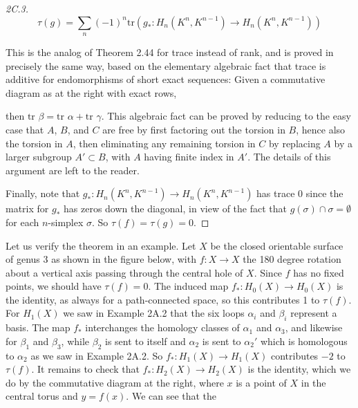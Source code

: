 \begin{proof}[2C.3]
\[
\tau(g) = \sum_n (-1)^n \text{tr}(g_* : H_n(K^n, K^{n-1}) \to H_n(K^n, K^{n-1}))
\]

This is the analog of Theorem 2.44 for trace instead of rank, and is proved in precisely
the same way, based on the elementary algebraic fact that trace is additive for endomorphisms of short exact sequences: Given a commutative diagram as at the right with exact rows,



then $\text{tr } \beta = \text{tr } \alpha + \text{tr } \gamma$. This algebraic fact can be
proved by reducing to the easy case that $A$, $B$, and
$C$ are free by first factoring out the torsion in $B$, hence also the torsion in $A$, then
eliminating any remaining torsion in $C$ by replacing $A$ by a larger subgroup $A' \subset B$,
with $A$ having finite index in $A'$. The details of this argument are left to the reader.

Finally, note that $g_* : H_n(K^n, K^{n-1}) \to H_n(K^n, K^{n-1})$ has trace 0 since the matrix
for $g_*$ has zeros down the diagonal, in view of the fact that $g(\sigma) \cap \sigma = \emptyset$ for each
$n$-simplex $\sigma$. So $\tau(f) = \tau(g) = 0$.
\end{proof}
\begin{example}
\label{ex:lefschetz-surface-rotation}
Let us verify the theorem in an example. Let $X$ be the closed orientable surface of genus 3 as shown in the figure below, with $f:X \to X$ the 180
degree rotation about a vertical axis passing through the central hole of
$X$. Since $f$ has no fixed points, we
should have $\tau(f) = 0$. The induced
map $f_* : H_0(X) \to H_0(X)$ is the identity, as always for a path-connected space, so this contributes 1 to $\tau(f)$. For $H_1(X)$
we saw in Example 2A.2 that the six loops $\alpha_i$ and $\beta_i$ represent a basis. The map
$f_*$ interchanges the homology classes of $\alpha_1$ and $\alpha_3$, and likewise for $\beta_1$ and $\beta_3$,
while $\beta_2$ is sent to itself and $\alpha_2$ is sent to $\alpha_2'$ which is homologous to $\alpha_2$ as we
saw in Example 2A.2. So $f_* : H_1(X) \to H_1(X)$ contributes $-2$ to $\tau(f)$. It remains
to check that $f_* : H_2(X) \to H_2(X)$ is the identity, which we do by the commutative diagram
at the right, where $x$ is a point of $X$ in the central torus and $y = f(x)$. We can see that the
\end{example}





